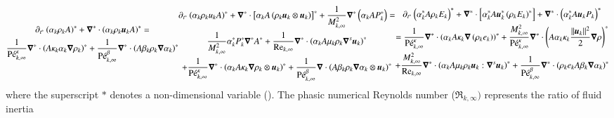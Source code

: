 \documentclass[preprint,10pt]{elsarticle}
\begin{document}
\begin{enumerate}
\begin{subequations}
%
\begin{multline}\label{eq:sev_equ-with-diss-terms-cont_case_one_scaled}
\partial_{t^*} \left( \alpha_k \rho_k A \right)^* + \grad^* \cdot \left( \alpha_k \rho_k \mbold u_k A \right)^* = \\ \frac{1}{\Pe^\kappa_{k,\infty}}\grad^* \cdot \left(A 
\kappa_k \alpha_k \grad \rho_k \right)^* +
\frac{1}{\Pe_{k,\infty}^\beta} \grad^* \cdot \left( A \beta_k \rho_k \grad \alpha_k \right)^*
\end{multline}
%
\begin{multline}\label{eq:sev_equ-with-diss-terms-mom_case_one_scaled}
\partial_{t^*} \left( \alpha_k \rho_k u_k A \right)^* + \grad^* \cdot \left[ \alpha_k A \left( \rho_k \mbold u_k \otimes \mbold u_k\right)\right]^* + \frac{1}{M^2_{k,
\infty}}\grad^* \left( \alpha_k A P_k^* \right) = \\
  \frac{1}{M^2_{k,\infty}} \alpha_k^* P^*_k \grad^* A^*  
+ \frac{1}{\Re_{k,\infty}}\grad^* \cdot \left( \alpha_k A \mu_k \rho_k \grad^s \mbold u_k \right)^* \\ 
+ \frac{1}{\Pe_{k,\infty}^\kappa} \grad^* \cdot\left( \alpha_k A \kappa_k \grad \rho_k \otimes \mbold u_k \right)^* 
+ \frac{1}{\Pe_{k,\infty}^\beta} \grad \cdot \left( A \beta_k \rho_k \grad \alpha_k \otimes \mbold u_k \right)^*
\end{multline}
%
\begin{multline}\label{eq:sev_equ-with-diss-terms-ener_case_one_scaled}
\partial_{t^*} \left( \alpha_k^* A \rho_k E_k \right)^* + \grad^* \cdot \left[ \alpha_k^* A \mbold u_k^*  \left( \rho_k E_k \right)^* \right] +  \grad^* \cdot 
\left(\alpha_k^* A \mbold u_k P_k \right)^*  \\ =
\frac{1}{\Pe_{k,\infty}^\kappa} \grad^* \cdot \left( \alpha_k A \kappa_k \grad \left( \rho_k e_k \right) \right)^* 
+ \frac{M^2_{k,\infty}}{\Pe_{k,\infty}^\kappa} \grad^* \cdot \left( A\alpha_k \kappa_k \frac{||\mbold u_k||^2}{2} \grad \rho \right)^*  \\
+ \frac{M^2_{k,\infty}}{\Re_{k,\infty}} \grad^* \cdot \left( \alpha_k A \mu_k \rho_k \mbold u_k : \grad^s \mbold u_k\right)^* 
+ \frac{1}{\Pe_{k,\infty}^\beta } \grad^*\cdot \left( \rho_k e_k A \beta_k \grad \alpha_k \right)^*
\end{multline}
%
\end{subequations}
%
where the superscript $*$ denotes a non-dimensional variable (). 
The phasic numerical Reynolds number ($\Re_{k,\infty})$ represents the ratio of fluid inertia 

\end{enumerate}
\end{document}
